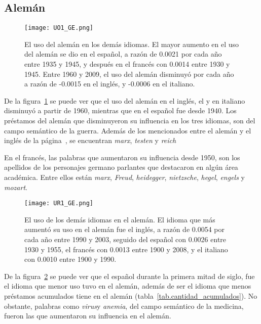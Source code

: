 \subsection{Alemán} %

\begin{figure}[h!]
	\centering
	\texttt{[image: UO1\_GE.png]}
	\caption{El uso del alemán en los demás idiomas. El mayor aumento en el uso del alemán se dio en el español, a razón de 0.0021 por cada año entre 1935 y 1945, y después en el francés con 0.0014 entre 1930 y 1945.  Entre 1960 y 2009, el uso del alemán disminuyó por cada año a razón de -0.0015 en el inglés, y -0.0006 en el italiano.}
	\label{fig.UO_GE}

\end{figure}

De la figura~\ref{fig.UO_GE} se puede ver que el uso del alemán en el inglés, el y en italiano disminuyó a partir de 1960, mientras que en el español fue desde 1940. Los préstamos del alemán que disminuyeron su influencia en los tres idiomas, son del campo semántico de la guerra. Además de los mencionados entre el alemán y el inglés de la página~\pageref{D-EN}, se encuentran \textit{marx}, \textit{testen} y \textit{reich}

En el francés, las palabras que aumentaron su influencia desde 1950,  son los apellidos de los personajes germano parlantes que destacaron en algún área académica. Entre ellos están \textit{marx}, \textit{Freud}, \textit{heidegger}, \textit{nietzsche}, \textit{hegel}, \textit{engels} y \textit{mozart}.
\label{GE-D}


\begin{figure}[h!]
	\centering
	\texttt{[image: UR1\_GE.png]}
	\caption{El uso de los demás idiomas en el alemán. El idioma que más aumentó su uso en el alemán fue el inglés, a razón de 0.0054  por cada año entre 1990 y 2003, seguido del español con 0.0026 entre 1930 y 1955, el francés con 0.0013 entre 1900 y 2008, y el italiano con 0.0010 entre 1900 y 1990.}
	\label{fig.UR_GE}
\end{figure}

De la figura~\ref{fig.UR_GE} se puede ver que el español durante la primera mitad de siglo, fue el idioma que menor uso tuvo en el alemán,  además de ser el idioma que menos préstamos acumulados tiene en el alemán (tabla~\ref{tab.cantidad_acumulados}). No obstante, palabras como  \textit{virus}y \textit{anemia}, del campo semántico de la medicina, fueron las que aumentaron su influencia en el alemán.


